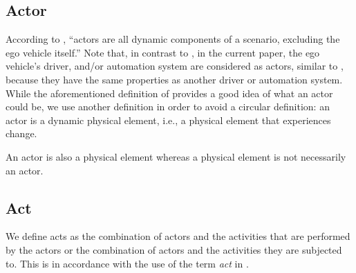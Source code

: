 \subsection{Actor}
\label{sec:actor}

According to \textcite{catapult2018musicc}, ``actors are all dynamic components of a scenario, excluding the ego vehicle itself.'' 
Note that, in contrast to \autocite{catapult2018musicc}, in the current paper, the ego vehicle's driver, and/or automation system are considered as actors, similar to \autocite{geyer2014},  because they have the same properties as another driver or automation system.
\cstarte While the aforementioned definition of \textcite{catapult2018musicc} provides a good idea of what an actor could be, we use another definition in order to avoid a circular definition: an actor is a dynamic physical element, i.e., a physical element that experiences change. \cende

\cstartc
\begin{remark}
	An actor is also a physical element whereas a physical element is not necessarily an actor.
\end{remark}
\cendc



\subsection{Act}
\label{sec:act}

We define acts as the combination of \cstarte actors \cende and the activities that are performed by the \cstarte actors \cende or the combination of \cstarte actors \cende and the activities they are subjected to.  %
This is in accordance with the use of the term \emph{act} in \autocite{openscenario}. 

 
